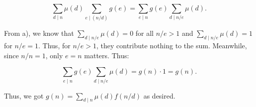 \documentclass{article}
\begin{document}
\begin{enumerate}[leftmargin=*, label=\arabic*.]
\begin{enumerate}[label=\alph*)]
$$\sum_{d \mid n} \mu(d) \sum_{e \mid (n/d)} g(e) = \sum_{e\mid n} g(e) \sum_{d\mid n/e} \mu(d).$$

From a), we know that $\sum_{d\mid n/e} \mu(d) = 0$ for all $n/e > 1$ and $\sum_{d\mid n/e} \mu(d) = 1$ for $n/e = 1$. Thus, for $n/e > 1$, they contribute nothing to the sum. Meanwhile, since $n/n = 1$, only $e = n$ matters. Thus: 

$$\sum_{e\mid n} g(e) \sum_{d\mid n/e} \mu(d) = g(n)\cdot 1 = g(n).$$

Thus, we got $g(n) = \sum_{d \mid n} \mu(d) f(n/d)$ as desired.


\end{enumerate}
\end{enumerate}
\end{document}
